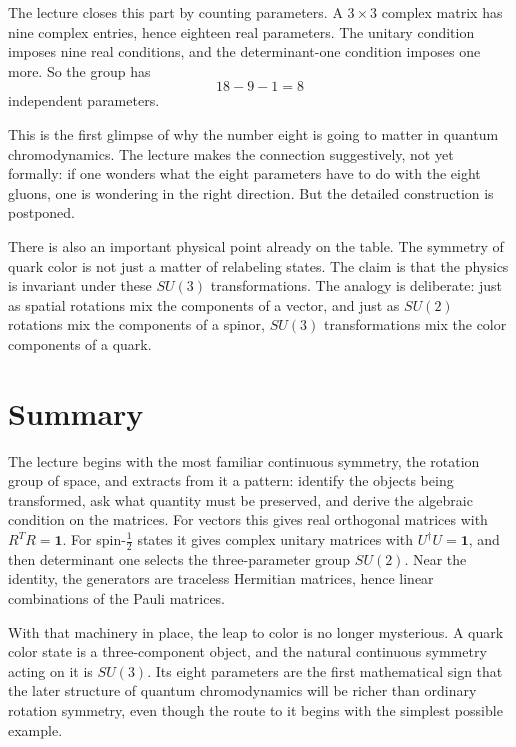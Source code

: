 The lecture closes this part by counting parameters. A \(3\times 3\) complex matrix has nine complex entries, hence eighteen real parameters. The unitary condition imposes nine real conditions, and the determinant-one condition imposes one more. So the group has
\begin{equation}
18-9-1=8
\end{equation}
independent parameters.

This is the first glimpse of why the number eight is going to matter in quantum chromodynamics. The lecture makes the connection suggestively, not yet formally: if one wonders what the eight parameters have to do with the eight gluons, one is wondering in the right direction. But the detailed construction is postponed.

There is also an important physical point already on the table. The symmetry of quark color is not just a matter of relabeling states. The claim is that the physics is invariant under these \(SU(3)\) transformations. The analogy is deliberate: just as spatial rotations mix the components of a vector, and just as \(SU(2)\) rotations mix the components of a spinor, \(SU(3)\) transformations mix the color components of a quark.

\section{Summary}

The lecture begins with the most familiar continuous symmetry, the rotation group of space, and extracts from it a pattern: identify the objects being transformed, ask what quantity must be preserved, and derive the algebraic condition on the matrices. For vectors this gives real orthogonal matrices with \(R^TR=\mathbf 1\). For spin-\(\frac12\) states it gives complex unitary matrices with \(U^\dagger U=\mathbf 1\), and then determinant one selects the three-parameter group \(SU(2)\). Near the identity, the generators are traceless Hermitian matrices, hence linear combinations of the Pauli matrices.

With that machinery in place, the leap to color is no longer mysterious. A quark color state is a three-component object, and the natural continuous symmetry acting on it is \(SU(3)\). Its eight parameters are the first mathematical sign that the later structure of quantum chromodynamics will be richer than ordinary rotation symmetry, even though the route to it begins with the simplest possible example.